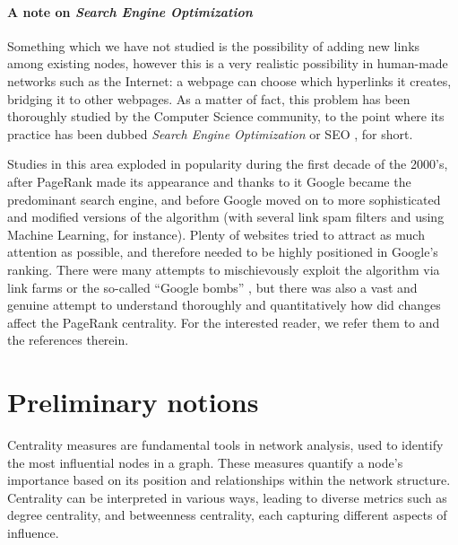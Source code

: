 \documentclass[sn-mathphys-ay]{sn-jnl}%
\theoremstyle{thmstyleone}%
\theoremstyle{thmstyletwo}%
\theoremstyle{thmstylethree}%
\begin{document}
\paragraph{A note on \textit{Search Engine Optimization}}\label{subsec:SEO}
Something which we have not studied is the possibility of adding new links among existing nodes, however this is a very realistic possibility in human-made networks such as the Internet: a webpage can choose which hyperlinks it creates, bridging it to other webpages. As a matter of fact, this problem has been thoroughly studied by the Computer Science community, to the point where its practice has been dubbed \textit{Search Engine Optimization} or SEO \cite{langville2006google}, for short. 

Studies in this area exploded in popularity during the first decade of the 2000's, after PageRank made its appearance and thanks to it Google became the predominant search engine, and before Google moved on to more sophisticated and modified versions of the algorithm (with several link spam filters and using Machine Learning, for instance). Plenty of websites tried to attract as much attention as possible, and therefore needed to be highly positioned in Google's ranking. There were many attempts to mischievously exploit the algorithm via link farms or the so-called ``Google bombs'' \cite{bar2007google, langville2006google}, but there was also a vast and genuine attempt to understand thoroughly and quantitatively how did changes affect the PageRank centrality. For the interested reader, we refer them to \cite{avrachenkov2006effect, olsen2010maximizing, sheldon2010manipulation, fercoq2013ergodic, csaji2014pagerank}  and the references therein.





\section{Preliminary notions}\label{sec:preliminary}


Centrality measures are fundamental tools in network analysis, used to identify the most influential nodes in a graph. These measures quantify a node's importance based on its position and relationships within the network structure. Centrality can be interpreted in various ways, leading to diverse metrics such as degree centrality, and betweenness centrality, each capturing different aspects of influence.
\end{document}
